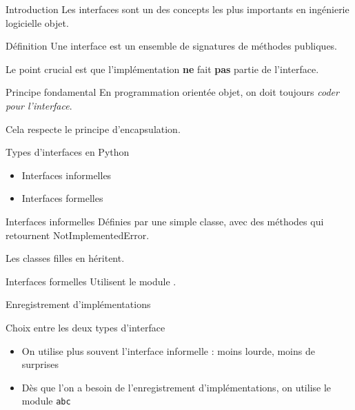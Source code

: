 \begin{frame}{Introduction}
  Les interfaces sont un des concepts les plus importants en ingénierie logicielle objet.
\end{frame}

\begin{frame}{Définition}
  Une interface est un ensemble de signatures de méthodes publiques.

  Le point crucial est que l'implémentation \textbf{ne} fait \textbf{pas} partie de l'interface.
\end{frame}

\begin{frame}{Principe fondamental}
  En programmation orientée objet, on doit toujours \emph{coder pour l'interface}.

  Cela respecte le principe d'encapsulation.
\end{frame}

\begin{frame}{Types d'interfaces en Python}
  \begin{itemize}
    \item Interfaces informelles
    \item Interfaces formelles
  \end{itemize}
\end{frame}

\begin{frame}{Interfaces informelles}
  Définies par une simple classe, avec des méthodes qui retournent NotImplementedError.

  Les classes filles en héritent.

\end{frame}

\begin{frame}{Interfaces formelles}
  Utilisent le module .

\end{frame}

\begin{frame}{Enregistrement d'implémentations}
\end{frame}

\begin{frame}{Choix entre les deux types d'interface}
  \begin{itemize}
    \item On utilise plus souvent l'interface informelle : moins lourde, moins de surprises
    \item Dès que l'on a besoin de l'enregistrement d'implémentations, on utilise le module \texttt{abc}
  \end{itemize}
\end{frame}